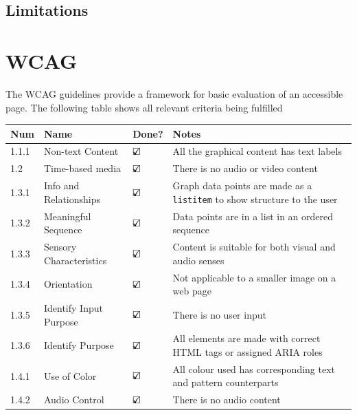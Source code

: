 \documentclass[ %
                    author={Aleena Baig},
                supervisor={Dr Simon Lock},
                    degree={BSc},
                     title={On Making Web Accessible Graphs},
                  subtitle={},
                      year={2019} ]{dissertation}
\begin{document}
\subsection{Limitations}


\section{WCAG}

The WCAG guidelines provide a framework for basic evaluation of an accessible page. The following table shows all relevant criteria being fulfilled

\begin{center}
\begin{longtable}{|p{2cm}|p{5cm}|p{2cm}|p{5cm}|}
 \hline
 Num & Name & Done? & Notes \\ [0.5ex]
 \hline \hline
 1.1.1 & Non-text Content & $\text{\rlap{$\checkmark$}}\square$ & All the graphical content has text labels\\
 \hline
 1.2 & Time-based media & $\text{\rlap{$\checkmark$}}\square$ & There is no audio or video content\\
 \hline
 1.3.1 & Info and Relationships & $\text{\rlap{$\checkmark$}}\square$ & Graph data points are made as a \texttt{listitem} to show structure to the user\\
 \hline
 1.3.2 & Meaningful Sequence & $\text{\rlap{$\checkmark$}}\square$ & Data points are in a list in an ordered sequence\\
 \hline
 1.3.3 & Sensory Characteristics & $\text{\rlap{$\checkmark$}}\square$ & Content is suitable for both visual and audio senses\\
 \hline
 1.3.4 & Orientation & $\text{\rlap{$\checkmark$}}\square$ & Not applicable to a smaller image on a web page\\
 \hline
 1.3.5 & Identify Input Purpose & $\text{\rlap{$\checkmark$}}\square$ & There is no user input\\
 \hline
 1.3.6 & Identify Purpose & $\text{\rlap{$\checkmark$}}\square$ & All elements are made with correct HTML tags or assigned ARIA roles\\
 \hline
 1.4.1 & Use of Color & $\text{\rlap{$\checkmark$}}\square$ & All colour used has corresponding text and pattern counterparts\\
 \hline
 1.4.2 & Audio Control & $\text{\rlap{$\checkmark$}}\square$ & There is no audio content\\

\end{longtable}
\end{center}
\end{document}
